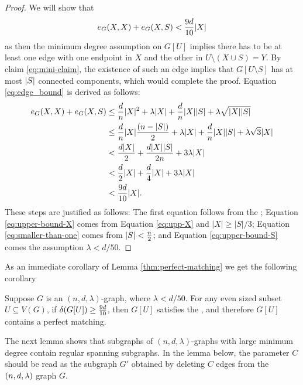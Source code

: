 \documentclass[11pt]{article}
\providecommand{\DIFadd}[1]{\textcolor{shin-ryoku}{#1}}%
\providecommand{\DIFaddbegin}{} %
\providecommand{\DIFaddend}{} %
\begin{document}
\begin{proof}
  We will show that
    \begin{equation} \label{eq:edge_bound}
        \CutEdges{X}{X}{G} + \CutEdges{X}{S}{G} < \cTilde|X|
    \end{equation}
    as then the minimum degree assumption on $G[U]$ implies there has to be at least one edge with one endpoint in $X$ and the other in $U \setminus (X \cup S) = Y$. By claim \eqref{eq:mini-claim}, the existence of such an edge implies that $G[U\setminus S]$ has at most $\Size{S}$ connected components, which would complete the proof.
    Equation \eqref{eq:edge_bound} is derived as follows: 
\begin{align}
  \CutEdges{X}{X}{G} + \CutEdges{X}{S}{G} &\le \frac{d}{n}|X|^2 + \lambda |X| + \frac{d}{n}|X||S| + \lambda\sqrt{|X||S|}        \\
&\le \frac{d}{n} |X| \frac{(n-|S|)}{2} + \lambda |X| + \frac{d}{n}|X||S| + \lambda\sqrt{3} |X| \label{eq:upper-bound-X}  \\
&< \frac{d|X|}{2} + \frac{d|X||S|}{2n} + 3 \lambda |X|\\
&< \frac{d}{2}|X| + \frac{d}{4}|X| + 3 \lambda |X| \label{eq:smaller-than-one} \\
&< \cTilde|X|.  \label{eq:upper-bound-S}
\end{align}
These steps are justified as follows: The first equation follows from the ; Equation \eqref{eq:upper-bound-X} comes from Equation \eqref{eq:upp-X} and $|X| \ge |S|/3$;
Equation \eqref{eq:smaller-than-one} comes from $\Size{S} < \frac{n}{2}$; and  Equation \eqref{eq:upper-bound-S} comes the assumption $\lambda < d/50$.
\end{proof}

As an immediate corollary of Lemma \ref{thm:perfect-matching} we get the following corollary
\begin{corollary}\label{cor:perfect-matching}
Suppose $G$ is an $(n, d, \lambda)$-graph, where $\lambda < d/50$. 
For any even sized subset $U \subseteq V(G)$, if $\delta(G[U]) \ge \cTilde$, then $G[U]$ satisfies the , and therefore $G[U]$ contains a perfect matching.  
\end{corollary}

The next lemma shows that subgraphs of $(n, d, \lambda)$-graphs with large minimum degree contain regular spanning subgraphs.
\DIFaddbegin \DIFadd{In the lemma below, the parameter $C$ should be read as the subgraph $G'$ obtained by deleting $C$ edges from the $\EnDeeLambda$ graph $G$.
}\DIFaddend 
\end{document}
